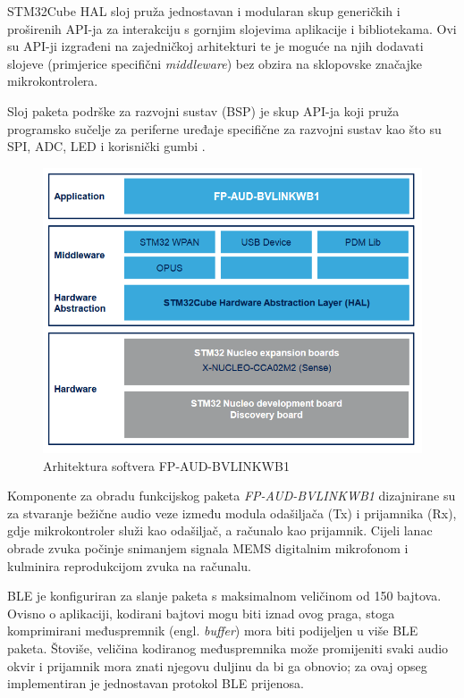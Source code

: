 STM32Cube HAL sloj pruža jednostavan i modularan skup generičkih i proširenih API-ja za interakciju s gornjim slojevima aplikacije i bibliotekama. Ovi su API-ji izgrađeni na zajedničkoj arhitekturi te je moguće na njih dodavati slojeve (primjerice specifični \textit{middleware}) bez obzira na sklopovske značajke mikrokontrolera.
 
Sloj paketa podrške za razvojni sustav (BSP) je skup API-ja koji pruža programsko sučelje za periferne uređaje specifične za razvojni sustav kao što su SPI, ADC, LED i korisnički gumbi \cite{fpaudbvlink}. 

\begin{figure}[ht]
	\includegraphics[width=\linewidth]{imgs/firmware_software_arch}
	\caption{Arhitektura softvera FP-AUD-BVLINKWB1 \cite{fpaudbvlink}}
	\label{fig:firmware_software_arch}
\end{figure}

Komponente za obradu funkcijskog paketa \textit{FP-AUD-BVLINKWB1} dizajnirane su za stvaranje bežične audio veze između modula odašiljača (Tx) i prijamnika (Rx), gdje mikrokontroler služi kao odašiljač, a računalo kao prijamnik. Cijeli lanac obrade zvuka počinje snimanjem signala MEMS digitalnim mikrofonom i kulminira reprodukcijom zvuka na računalu.

BLE je konfiguriran za slanje paketa s maksimalnom veličinom od 150 bajtova. Ovisno o aplikaciji, kodirani bajtovi mogu biti iznad ovog praga, stoga komprimirani međuspremnik (engl. \textit{buffer}) mora biti podijeljen u više BLE paketa. Štoviše, veličina kodiranog međuspremnika može promijeniti svaki audio okvir i prijamnik mora znati njegovu duljinu da bi ga obnovio; za ovaj opseg implementiran je jednostavan protokol BLE prijenosa.

